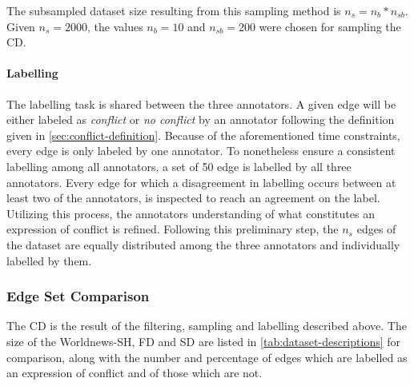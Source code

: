 \documentclass[11pt]{scrreprt}
\begin{document}
The subsampled dataset size resulting from this sampling method is \(n_{s} = n_{b} * n_{sb}\). Given \(n_{s} = 2000\), the values \(n_b = 10\) and \(n_{sb} = 200\) were chosen for sampling the CD.


\paragraph{Labelling}
The labelling task is shared between the three annotators. A given edge will be either labeled as \textit{conflict} or \textit{no conflict} by an annotator following the definition given in \cref{sec:conflict-definition}. Because of the aforementioned time constraints, every edge is only labeled by one annotator. To nonetheless ensure a consistent labelling among all annotators, a set of 50 edge is labelled by all three annotators. Every edge for which a disagreement in labelling occurs between at least two of the annotators, is inspected to reach an agreement on the label. Utilizing this process, the annotators understanding of what constitutes an expression of conflict is refined. Following this preliminary step, the \(n_s\) edges of the dataset are equally distributed among the three annotators and individually labelled by them.


\subsubsection{Edge Set Comparison}
The CD is the result of the filtering, sampling and labelling described above. The size of the Worldnews-SH, FD and SD are listed in \cref{tab:dataset-descriptions} for comparison, along with the number and percentage of edges which are labelled as an expression of conflict and of those which are not.
\end{document}
